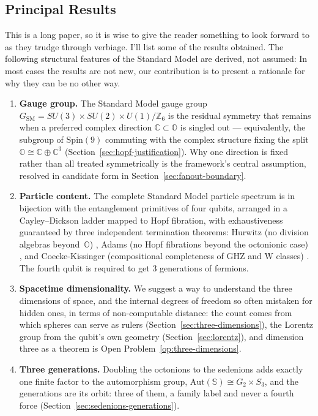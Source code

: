 \documentclass{article}
\theoremstyle{plain}
\theoremstyle{definition}
\theoremstyle{remark}\newtheorem*{remark}{Remark}
\begin{document}
\subsection{Principal Results}
This is a long paper, so it is wise to give the reader something to look forward to as they
trudge through verbiage. I'll list some of the results obtained. The following structural
features of the Standard Model are derived, not assumed: In most cases the results are not new,
our contribution is to present a rationale for why they can be no other way.

\begin{enumerate}
\item \textbf{Gauge group.} The Standard Model gauge group
$G_{\mathrm{SM}} = SU(3) \times SU(2) \times U(1)/\mathbb{Z}_6$ is the residual symmetry that
remains when a preferred complex direction $\mathbb{C} \subset \mathbb{O}$ is singled out ---
equivalently, the subgroup of $\mathrm{Spin}(9)$ commuting with the complex structure fixing the
split $\mathbb{O} \cong \mathbb{C} \oplus \mathbb{C}^3$ (Section~\ref{sec:hopf-justification}).
Why one direction is fixed rather than all treated symmetrically is the framework's central
assumption, resolved in candidate form in Section~\ref{sec:fanout-boundary}.

\item \textbf{Particle content.} The complete Standard Model particle spectrum is in bijection
with the entanglement primitives of four qubits, arranged in a Cayley--Dickson ladder mapped to
Hopf fibration, with exhaustiveness guaranteed by three independent termination theorems:
Hurwitz (no division algebras beyond~$\mathbb{O}$) \autocite{hurwitz1898composition}, Adams (no
Hopf fibrations beyond the octonionic case) \autocite{adams1960hopf}, and Coecke-Kissinger
(compositional completeness of GHZ and W classes) \autocite{coeckekissinger2010compositional}.
The fourth qubit is required to get 3 generations of fermions.

\item \textbf{Spacetime dimensionality.} We suggest a way to understand the three dimensions of
space, and the internal degrees of freedom so often mistaken for hidden ones, in terms of
non-computable distance: the count comes from which spheres can serve as rulers
(Section~\ref{sec:three-dimensions}), the Lorentz group from the qubit's own geometry
(Section~\ref{sec:lorentz}), and dimension three as a theorem is Open
Problem~\ref{op:three-dimensions}.


\item \textbf{Three generations.} Doubling the octonions to the sedenions adds exactly one
finite factor to the automorphism group, $\mathrm{Aut}(\mathbb{S}) \cong G_2 \times S_3$, and
the generations are its orbit: three of them, a family label and never a fourth force
(Section~\ref{sec:sedenions-generations}).


\end{enumerate}
\end{document}
